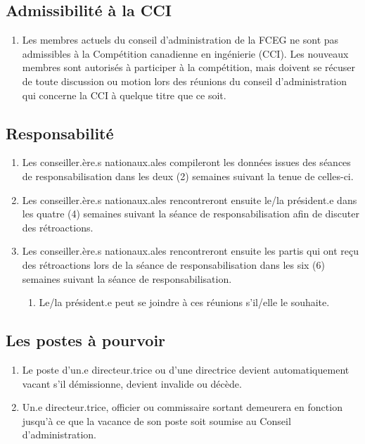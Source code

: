 \subsection{Admissibilité à la CCI}
\label{admissibilite-a-la-cci}

\begin{enumerate}
 \item
  Les membres actuels du conseil d'administration de la FCEG ne sont pas admissibles à la Compétition canadienne en ingénierie (CCI). Les nouveaux membres sont autorisés à participer à la compétition, mais doivent se récuser de toute discussion ou motion lors des réunions du conseil d'administration qui concerne la CCI à quelque titre que ce soit.
\end{enumerate}

\subsection{Responsabilité}
\label{responsabilite}

\begin{enumerate}
 \item
  Les conseiller.ère.s nationaux.ales compileront les données issues des séances de responsabilisation dans les deux (2) semaines suivant la tenue de celles-ci.
 \item
  Les conseiller.ère.s nationaux.ales rencontreront ensuite le/la président.e dans les quatre (4) semaines suivant la séance de responsabilisation afin de discuter des rétroactions.
 \item
  Les conseiller.ère.s nationaux.ales rencontreront ensuite les partis qui ont reçu des rétroactions lors de la séance de responsabilisation dans les six (6) semaines suivant la séance de responsabilisation.
  \begin{enumerate}
   \item
    Le/la président.e peut se joindre à ces réunions s'il/elle le souhaite.
  \end{enumerate}
\end{enumerate}

\subsection{Les postes à pourvoir}
\label{les-postes-a-pourvoir}

\begin{enumerate}
 \item
  Le poste d'un.e directeur.trice ou d'une directrice devient automatiquement vacant s'il démissionne, devient invalide ou décède.
 \item
  Un.e directeur.trice, officier ou commissaire sortant demeurera en fonction jusqu'à ce que la vacance de son poste soit soumise au Conseil d'administration.
\end{enumerate}


